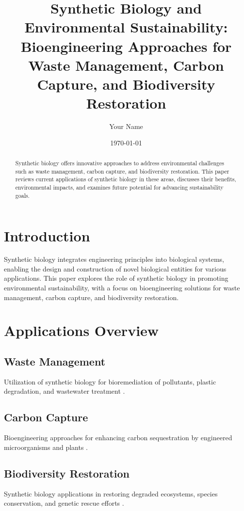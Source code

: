 \documentclass[12pt]{article}
\title{Synthetic Biology and Environmental Sustainability: Bioengineering Approaches for Waste Management, Carbon Capture, and Biodiversity Restoration}
\author{Your Name}
\date{\today}
\begin{document}
\maketitle

\begin{abstract}
Synthetic biology offers innovative approaches to address environmental challenges such as waste management, carbon capture, and biodiversity restoration. This paper reviews current applications of synthetic biology in these areas, discusses their benefits, environmental impacts, and examines future potential for advancing sustainability goals.
\end{abstract}

\section{Introduction}
Synthetic biology integrates engineering principles into biological systems, enabling the design and construction of novel biological entities for various applications. This paper explores the role of synthetic biology in promoting environmental sustainability, with a focus on bioengineering solutions for waste management, carbon capture, and biodiversity restoration.

\section{Applications Overview}
\subsection{Waste Management}
Utilization of synthetic biology for bioremediation of pollutants, plastic degradation, and wastewater treatment \citep{dvoøák2020microbial, turner2020microbial}.

\subsection{Carbon Capture}
Bioengineering approaches for enhancing carbon sequestration by engineered microorganisms and plants \citep{carrasco2020engineering, mcginn2020photosynthetic}.

\subsection{Biodiversity Restoration}
Synthetic biology applications in restoring degraded ecosystems, species conservation, and genetic rescue efforts \citep{debus2017synthetic, seddon2021genomic}.
\end{document}
